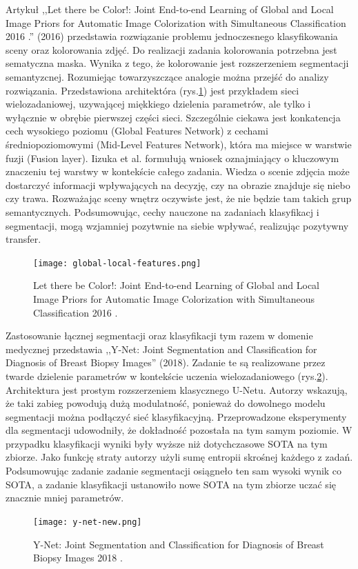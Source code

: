 Artykuł ,,Let there be Color!: Joint End-to-end Learning of Global and Local Image Priors for Automatic Image Colorization with Simultaneous Classification 2016 \cite{iizuka2016let}.'' (2016) przedstawia rozwiązanie problemu jednoczesnego klasyfikowania sceny oraz kolorowania zdjęć. Do realizacji zadania kolorowania potrzebna jest sematyczna maska. Wynika z tego, że kolorowanie jest rozszerzeniem segmentacji semantyzcnej. Rozumiejąc towarzyszczące analogie można przejść do analizy rozwiązania. Przedstawiona architektóra (rys.\ref{fig:parrarel-arch}) jest przykładem sieci wielozadaniowej, uzywającej miękkiego dzielenia parametrów, ale tylko i wyłącznie w obrębie pierwszej części sieci. Szczególnie ciekawa jest konkatencja cech wysokiego poziomu (Global Features Network) z cechami średniopoziomowymi (Mid-Level Features Network), która ma miejsce w warstwie fuzji (Fusion layer). Iizuka et al. formułują wniosek oznajmiający o kluczowym znaczeniu tej warstwy w kontekście całego zadania. Wiedza o scenie zdjęcia może dostarczyć informacji wpływających na decyzję, czy na obrazie znajduje się niebo czy trawa. Rozważając sceny wnętrz oczywiste jest, że nie będzie tam takich grup semantycznych. Podsumowując, cechy nauczone na zadaniach klasyfikacj i segmentacji, mogą wzjamniej pozytwnie na siebie wpływać, realizując pozytywny transfer.

\begin{figure}[ht!]
    \texttt{[image: global-local-features.png]}
    \caption{Let there be Color!: Joint End-to-end Learning of Global and Local Image Priors for Automatic Image Colorization with Simultaneous Classification 2016 \cite{iizuka2016let}.}
    \label{fig:parrarel-arch}
\end{figure}

Zastosowanie łącznej segmentacji oraz klasyfikacji tym razem w domenie medycznej przedstawia ,,Y-Net: Joint Segmentation and Classification for Diagnosis of Breast Biopsy Images'' \cite{mehta2018net} (2018). Zadanie te są realizowane przez twarde dzielenie parametrów w kontekście uczenia wielozadaniowego (rys.\ref{fig:y-net}). Architektura jest prostym rozszerzeniem klasycznego U-Netu. Autorzy wskazują, że taki zabieg powodują dużą modulatność, ponieważ do dowolnego modelu segmentacji można podłączyć sieć klasyfikacyjną. Przeprowadzone eksperymenty dla segmentacji udowodniły, że dokładność pozostała na tym samym poziomie. W przypadku klasyfikacji wyniki były wyższe niż dotychczasowe SOTA na tym zbiorze. Jako funkcję straty autorzy użyli sumę entropii skrośnej każdego z zadań. Podsumowując zadanie zadanie segmentacji osiągneło ten sam wysoki wynik co SOTA, a zadanie klasyfikacji ustanowiło nowe SOTA na tym zbiorze uczać się znacznie mniej parametrów.
\begin{figure}[ht!]
    \texttt{[image: y-net-new.png]}
    \caption{Y-Net: Joint Segmentation and Classification for Diagnosis of Breast Biopsy Images 2018 \cite{mehta2018net}.}
    \label{fig:y-net}
\end{figure}


